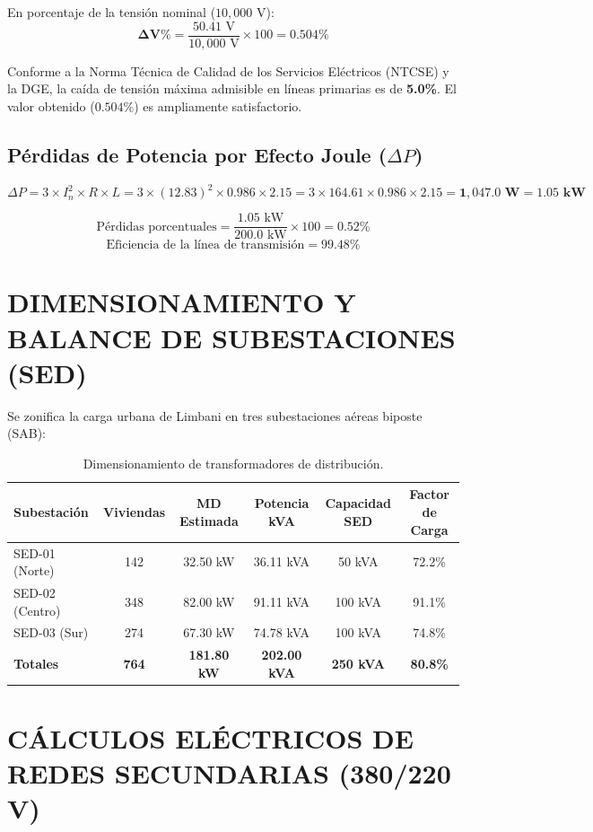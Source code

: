 En porcentaje de la tensión nominal ($10,000\text{ V}$):
$$\mathbf{\Delta V\%} = \frac{50.41\text{ V}}{10,000\text{ V}} \times 100 = \mathbf{0.504\%}$$

Conforme a la Norma Técnica de Calidad de los Servicios Eléctricos (NTCSE) y la DGE, la caída de tensión máxima admisible en líneas primarias es de \textbf{5.0\%}. El valor obtenido ($0.504\%$) es ampliamente satisfactorio.

\subsection{Pérdidas de Potencia por Efecto Joule ($\Delta P$)}
$$\Delta P = 3 \times I_n^2 \times R \times L = 3 \times (12.83)^2 \times 0.986 \times 2.15 = 3 \times 164.61 \times 0.986 \times 2.15 = \mathbf{1,047.0\text{ W}} = \mathbf{1.05\text{ kW}}$$

$$\text{Pérdidas porcentuales} = \frac{1.05\text{ kW}}{200.0\text{ kW}} \times 100 = \mathbf{0.52\%}$$
$$\text{Eficiencia de la línea de transmisión} = \mathbf{99.48\%}$$

\section{DIMENSIONAMIENTO Y BALANCE DE SUBESTACIONES (SED)}

Se zonifica la carga urbana de Limbani en tres subestaciones aéreas biposte (SAB):

\begin{table}[H]
\centering
\small
\begin{tabular}{|l|c|c|c|c|c|}
\hline
\textbf{Subestación} & \textbf{Viviendas} & \textbf{MD Estimada} & \textbf{Potencia kVA} & \textbf{Capacidad SED} & \textbf{Factor de Carga} \\
\hline
SED-01 (Norte) & 142 & 32.50 kW & 36.11 kVA & 50 kVA & 72.2\% \\
SED-02 (Centro) & 348 & 82.00 kW & 91.11 kVA & 100 kVA & 91.1\% \\
SED-03 (Sur) & 274 & 67.30 kW & 74.78 kVA & 100 kVA & 74.8\% \\
\hline
\textbf{Totales} & \textbf{764} & \textbf{181.80 kW} & \textbf{202.00 kVA} & \textbf{250 kVA} & \textbf{80.8\%} \\
\hline
\end{tabular}
\caption{Dimensionamiento de transformadores de distribución.}
\end{table}

\section{CÁLCULOS ELÉCTRICOS DE REDES SECUNDARIAS (380/220 V)}


